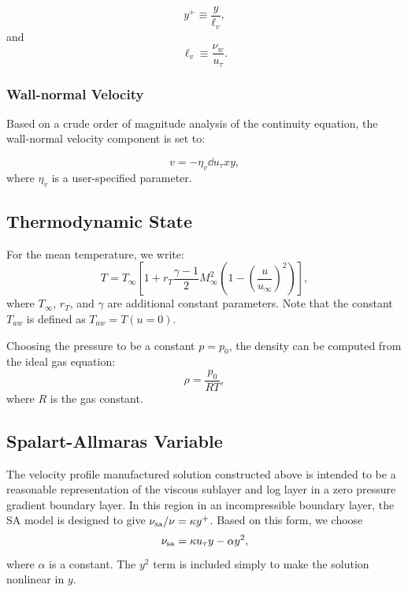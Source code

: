 %
\begin{equation}
y^+ \equiv \frac{y}{\ell_v},
\end{equation}
%
and
%
\begin{equation} \label{eqn:visc_length}
\ell_v \equiv \frac{\nu_w}{u_{\tau}}.
\end{equation}
%


\subsubsection{Wall-normal Velocity}
Based on a crude order of magnitude analysis of the continuity
equation, the wall-normal velocity component is set to:

%
\begin{equation} \label{eqn:wall_normal_vel}
v = -\eta_v \dd{u_{\tau}}{x} y ,
\end{equation}
%
where $\eta_v$ is a user-specified parameter.

\subsection{Thermodynamic State} \label{sec:thermodynamic_state}
For the mean temperature, we write:
%
\begin{equation} \label{eqn:temp_vel}
T = T_{\infty} \left[ 1 + r_T \frac{\gamma - 1}{2} M_{\infty}^2 \left( 1 - \left(\frac{u}{u_{\infty}  }\right)^2 \right) \right],
\end{equation}
% 
where $T_{\infty}$, $r_T$, and $\gamma$ are additional constant
parameters.  Note that the constant $T_{aw}$ is defined as $T_{aw} = T(u=0)$.

Choosing the pressure to be a constant $p = p_0$, the
density can be computed from the ideal gas equation:
%
\begin{equation} \label{eqn:ideal_gas}
\rho = \frac{p_0}{R T},
\end{equation}
%
where $R$ is the gas constant.

\subsection{Spalart-Allmaras Variable} \label{sec:sa_state_field}
The velocity profile manufactured solution constructed above is
intended to be a reasonable representation of the viscous sublayer and
log layer in a zero pressure gradient boundary layer.  In this region
in an incompressible boundary layer, the SA model is designed to give
$\nu_{\mathrm{sa}}/\nu = \kappa y^+$.  Based on this form, we choose
%
\begin{equation} \label{eqn:nutil}
\nu_{\mathrm{sa}} = \kappa u_{\tau} y - \alpha y^2,
\end{equation}
%
where $\alpha$ is a constant.  The $y^2$ term is included simply to
make the solution nonlinear in $y$.

